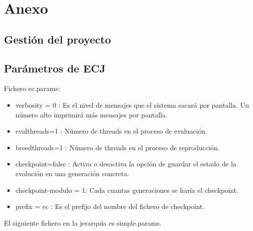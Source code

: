 \chapter{Anexo}\label{ch:anexos}

\section{Gestión del proyecto}\label{sec:gestion-pr}



\section{Parámetros de ECJ}\label{sec:ecj-params}

Fichero ec.params:

\begin{itemize}
\item verbosity = 0 : Es el nivel de mensajes que el sistema sacará por pantalla. Un número alto imprimirá más mensajes por pantalla.
\item	evalthreads=1 : Número de threads en el proceso de evaluación.
\item	breedthreads=1 : Número de threads en el proceso de reproducción.
\item	checkpoint=false : Activa o desactiva la opción de guardar el estado de
la evolución en una generación concreta.
\item	checkpoint-modulo = 1: Cada cuantas generaciones se haría el checkpoint.
\item	prefix = ec : Es el prefijo del nombre del fichero de checkpoint. 
\end{itemize}

El siguiente fichero en la jerarquía es simple.params. 

